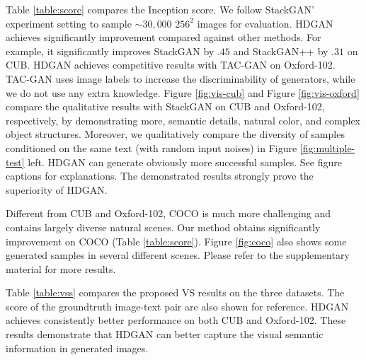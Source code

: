 \documentclass[10pt,twocolumn,letterpaper]{article}
\begin{document}
Table \ref{table:score} compares the Inception score. We follow StackGAN' experiment setting to sample ${\sim}30,000$ $256^2$ images for evaluation.
HDGAN achieves significantly improvement compared against other methods. For example, it significantly improves StackGAN by $.45$ and StackGAN++ by $.31$ on CUB.
HDGAN achieves competitive results with TAC-GAN on Oxford-102. TAC-GAN uses image labels to increase the discriminability of generators, while we do not use any extra knowledge. Figure \ref{fig:vis-cub} and Figure \ref{fig:vis-oxford} compare the qualitative results with StackGAN on CUB and Oxford-102, respectively, by demonstrating more, semantic details, natural color, and complex object structures. 
Moreover, we qualitatively compare the diversity of samples conditioned on the same text (with random input noises) in Figure \ref{fig:multiple-test} left. HDGAN can generate obviously more successful samples. See figure captions for explanations. The demonstrated results strongly prove the superiority of HDGAN. 

Different from CUB and Oxford-102, COCO is much more challenging and contains largely diverse natural scenes. 
Our method obtains significantly improvement on COCO (Table \ref{table:score}). 
Figure \ref{fig:coco} also shows some generated samples in several different scenes.
Please refer to the supplementary material for more results. 


Table \ref{table:vss} compares the proposed VS results on the three datasets. The score of the groundtruth image-text pair are also shown for reference.  HDGAN achieves consistently better performance on both CUB and Oxford-102. These results demonstrate that HDGAN can better capture the visual semantic information in generated images. 


\end{document}
